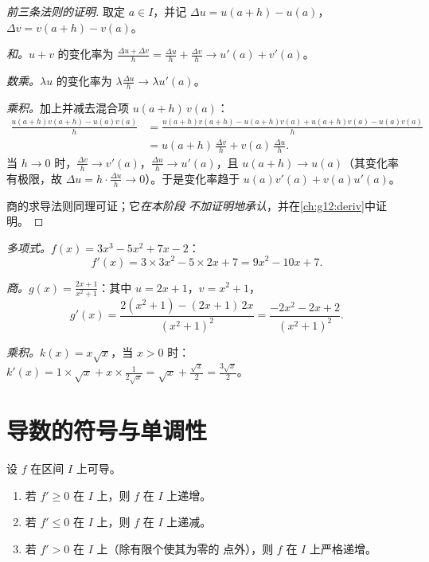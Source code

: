 \begin{proof}[前三条法则的证明]
取定 $a \in I$，并记 $\Delta u = u(a+h) - u(a)$，
$\Delta v = v(a+h) - v(a)$。

\emph{和。}$u + v$ 的变化率为
$\frac{\Delta u + \Delta v}{h} = \frac{\Delta u}{h} + \frac{\Delta v}{h}
\to u'(a) + v'(a)$。

\emph{数乘。}$\lambda u$ 的变化率为
$\lambda \frac{\Delta u}{h} \to \lambda u'(a)$。

\emph{乘积。}加上并减去混合项 $u(a+h)\,v(a)$：
\begin{align*}
\frac{u(a+h)v(a+h) - u(a)v(a)}{h}
&= \frac{u(a+h)v(a+h) - u(a+h)v(a) + u(a+h)v(a) - u(a)v(a)}{h}\\
&= u(a+h)\,\frac{\Delta v}{h} + v(a)\,\frac{\Delta u}{h}.
\end{align*}
当 $h \to 0$ 时，$\frac{\Delta v}{h} \to v'(a)$，$\frac{\Delta u}{h} \to
u'(a)$，且 $u(a+h) \to u(a)$（其变化率有极限，故
$\Delta u = h \cdot \frac{\Delta u}{h} \to 0$）。于是变化率趋于
$u(a)v'(a) + v(a)u'(a)$。

商的求导法则同理可证；它\emph{在本阶段
不加证明地承认}，并在\cref{ch:g12:deriv}中证明。
\end{proof}

\begin{example}\label{ex:g11:deriv:computations}
\emph{多项式。}$f(x) = 3x^3 - 5x^2 + 7x - 2$：
\[
f'(x) = 3 \times 3x^2 - 5 \times 2x + 7 = 9x^2 - 10x + 7 .
\]

\emph{商。}$g(x) = \frac{2x+1}{x^2+1}$：其中 $u = 2x + 1$，$v = x^2
+ 1$，
\[
g'(x) = \frac{2(x^2+1) - (2x+1)\,2x}{(x^2+1)^2}
= \frac{-2x^2 - 2x + 2}{(x^2+1)^2}.
\]

\emph{乘积。}$k(x) = x\sqrt x$，当 $x > 0$ 时：
$k'(x) = 1 \times \sqrt x + x \times \frac{1}{2\sqrt x}
= \sqrt x + \frac{\sqrt x}{2} = \frac{3\sqrt x}{2}$。
\end{example}

\section{导数的符号与单调性}

\begin{theorem}[导数与单调性]\label{thm:g11:deriv:variations}
设 $f$ 在区间 $I$ 上可导。
\begin{enumerate}
  \item 若 $f' \geq 0$ 在 $I$ 上，则 $f$ 在 $I$ 上递增。
  \item 若 $f' \leq 0$ 在 $I$ 上，则 $f$ 在 $I$ 上递减。
  \item 若 $f' > 0$ 在 $I$ 上（除有限个使其为零的
        点外），则 $f$ 在 $I$ 上严格递增。
\end{enumerate}
\end{theorem}

